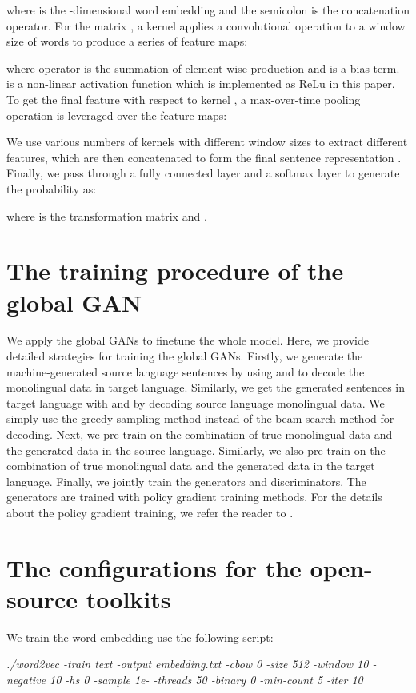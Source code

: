 \documentclass[11pt,a4paper]{article}
\begin{document}
where  is the -dimensional word embedding and the semicolon is the concatenation operator. For the matrix , a kernel  applies a convolutional operation to a window size of  words to produce a series of feature maps:

where  operator is the summation of element-wise production and  is a bias term.  is a non-linear activation function which is implemented as ReLu in this paper. To get the final feature with respect to kernel , a max-over-time pooling operation is leveraged over the feature maps:

We use various numbers of kernels with different window sizes to extract different features, which are then concatenated to form the final sentence representation . Finally, we pass  through a fully connected layer and a softmax layer to generate the probability  as:

where  is the transformation matrix and .

\section{The training procedure of the global GAN}
\label{sec:training procedure of global GAN}
We apply the global GANs to finetune the whole model. Here, we provide detailed strategies for training the global GANs. Firstly, we generate the machine-generated source language sentences by using  and  to decode the monolingual data in target language. Similarly, we get the generated sentences in target language with  and  by decoding source language monolingual data. We simply use the greedy sampling method instead of the beam search method for decoding. Next, we pre-train  on the combination of true monolingual data and the generated data in the source language. Similarly, we also pre-train  on the combination of true monolingual data and the generated data in the target language. Finally, we jointly train the generators and discriminators. The generators are trained with policy gradient training methods. For the details about the policy gradient training, we refer the reader to \cite{Yang2017Improving}.

\section{The configurations for the open-source toolkits}
\label{sec:configuration for toolkits}
We train the word embedding use the following script:

\emph{./word2vec -train text -output embedding.txt -cbow 0 -size 512 -window 10 -negative 10 -hs 0 -sample 1e- -threads 50 -binary 0 -min-count 5 -iter 10}
\end{document}
